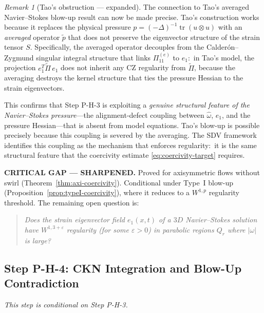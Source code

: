\documentclass[11pt]{article}
\theoremstyle{definition}
\theoremstyle{remark}
\newtheorem{remark}[theorem]{Remark}
\DeclareMathOperator{\tr}{tr}
\newcommand{\eps}{\varepsilon}
\begin{document}
\begin{remark}[Tao's obstruction --- expanded]\label{rem:tao-expanded}
The connection to Tao's averaged Navier--Stokes blow-up result \cite{Tao} can now
be made precise.  Tao's construction works because it replaces the physical
pressure $p = (-\Delta)^{-1}\tr(u \otimes u)$ with an \emph{averaged} operator
$\widetilde{p}$ that does not preserve the eigenvector structure of the strain
tensor $S$.  Specifically, the averaged operator decouples from the
Calder\'on--Zygmund singular integral structure that links $\Pi_{11}^{(e)}$ to
$e_1$:\ in Tao's model, the projection $e_1^T \widetilde{\Pi}\, e_1$ does
not inherit any CZ regularity from $\widetilde{\Pi}$, because the averaging
destroys the kernel structure that ties the pressure Hessian to the strain
eigenvectors.

This confirms that Step P-H-3 is exploiting a \emph{genuine structural feature
of the Navier--Stokes pressure}---the alignment-defect coupling between
$\hat{\omega}$, $e_1$, and the pressure Hessian---that is absent from
model equations.  Tao's blow-up is possible precisely because this coupling
is severed by the averaging.  The SDV framework identifies this coupling as
the mechanism that enforces regularity:\ it is the same structural feature that
the coercivity estimate \eqref{eq:coercivity-target} requires.
\end{remark}

\textbf{CRITICAL GAP --- SHARPENED.}  Proved for axisymmetric flows without swirl
(Theorem~\ref{thm:axi-coercivity}).  Conditional under Type~I blow-up
(Proposition~\ref{prop:typeI-coercivity}), where it reduces to a $W^{1,p}$
regularity threshold.  The remaining open question is:
\begin{quote}
\textit{Does the strain eigenvector field $e_1(x,t)$ of a $3D$ Navier--Stokes
solution have $W^{1,3+\eps}$ regularity (for some $\eps > 0$) in parabolic regions
$Q_r$ where $|\omega|$ is large?}
\end{quote}

\subsection{Step P-H-4: CKN Integration and Blow-Up Contradiction}
\label{sec:PH4}

\emph{This step is conditional on Step P-H-3.}
\end{document}
